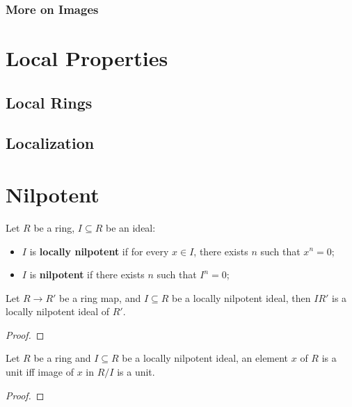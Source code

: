 \documentclass[Total.tex]{subfiles}
\begin{document}
			\subsubsection{More on Images}
			
			\section{Local Properties}
			\subsection{Local Rings}
			\subsection{Localization}
		
		\section{Nilpotent}
		
			\begin{Def}
				Let $R$ be a ring, $I\subseteq R$ be an ideal:
				
				\begin{itemize}
					\item $I$ is \textbf{locally nilpotent} if for every $x\in I$, there exists $n$ such that $x^n=0$;
					\item $I$ is \textbf{nilpotent} if there exists $n$ such that $I^n=0$; 
				\end{itemize}
			\end{Def}
			
			\begin{lemma}
				Let $R\rightarrow R'$ be a ring map, and $I\subseteq R$ be a locally nilpotent ideal, then $IR'$ is a locally nilpotent ideal of $R'$.
			\end{lemma}
			
			\begin{proof}
			\end{proof}
			
			\begin{lemma}
				Let $R$ be a ring and $I\subseteq R$ be a locally nilpotent ideal, an element $x$ of $R$ is a unit iff image of $x$ in $R/I$ is a unit.
			\end{lemma}
			
			\begin{proof}
			\end{proof}
			
\end{document}
